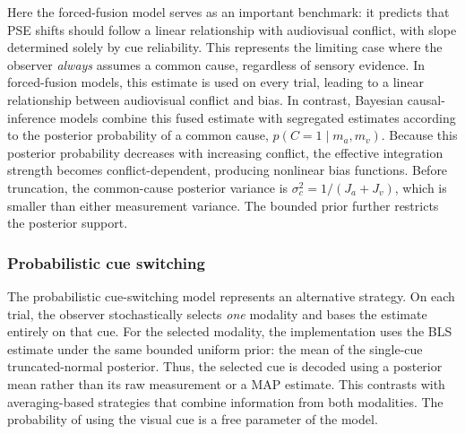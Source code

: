 \documentclass{jov}
\begin{document}
Here the forced-fusion model serves as an important benchmark: it predicts that PSE shifts should follow a linear relationship with audiovisual conflict, with slope determined solely by cue reliability. This represents the limiting case where the observer \textit{always} assumes a common cause, regardless of sensory evidence. 
In forced-fusion models, this estimate is used on every trial, leading to a linear relationship between audiovisual conflict and bias. In contrast, Bayesian causal-inference models combine this fused estimate with segregated estimates according to the posterior probability of a common cause, $p(C=1 \mid m_a,m_v)$. Because this posterior probability decreases with increasing conflict, the effective integration strength becomes conflict-dependent, producing nonlinear bias functions.
Before truncation, the common-cause posterior variance is $\sigma_c^2=1/(J_a+J_v)$, which is smaller than either measurement variance. The bounded prior further restricts the posterior support.

\subsubsection{Probabilistic cue switching}

The probabilistic cue-switching model represents an alternative strategy. On each trial, the observer stochastically selects \textit{one} modality and bases the estimate entirely on that cue. For the selected modality, the implementation uses the BLS estimate under the same bounded uniform prior: the mean of the single-cue truncated-normal posterior. Thus, the selected cue is decoded using a posterior mean rather than its raw measurement or a MAP estimate. This contrasts with averaging-based strategies that combine information from both modalities. The probability of using the visual cue is a free parameter of the model.


\end{document}
